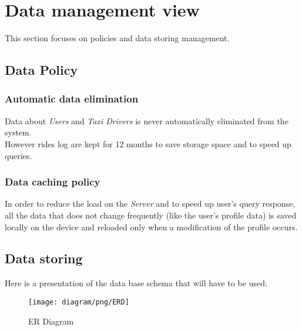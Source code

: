 \section{Data management view} %
\label{sec:data_management}
This section focuses on policies and data storing management.\\
\subsection{Data Policy} %
\label{sub:data_policy}
\subsubsection{Automatic data elimination} %
\label{ssub:data_elimination}
Data about \emph{Users} and \emph{Taxi Drivers} is never automatically eliminated from the system.\\
However rides log are kept for 12 months to save storage space and to speed up queries.
\subsubsection{Data caching policy} %
\label{ssub:data_caching}
In order to reduce the load on the \emph{Server} and to speed up user's query response, all the data that does not change frequently (like the user's profile data) is saved locally on the device and reloaded only when a modification of the profile occurs.

\subsection{Data storing} %
Here is a presentation of the data base schema that will have to be used:

\label{sub:data_storing}
\begin{figure}[h!t]
\caption{ER Diagram}
\texttt{[image: diagram/png/ERD]}
\centering
\end{figure}
\newpage

